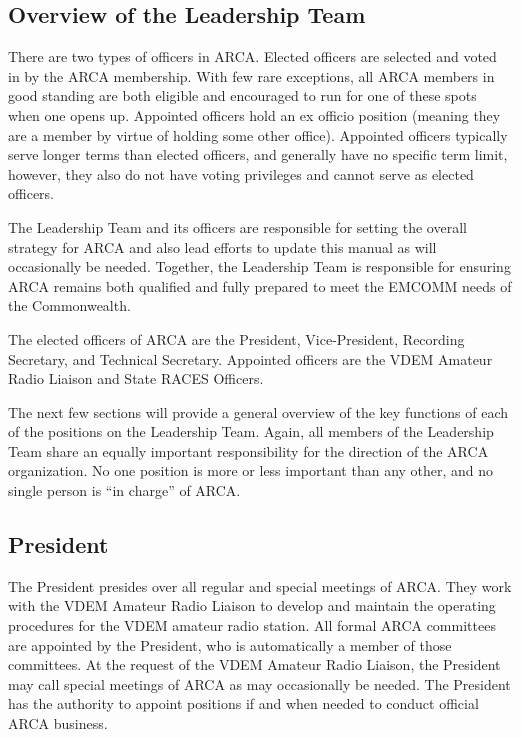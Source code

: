 \documentclass[pdflatex,letterpaper,twoside,12pt]{book}
\begin{document}
\subsection{Overview of the Leadership Team}

There are two types of officers in ARCA.  Elected officers are selected and voted in by the ARCA membership.  With few rare exceptions, all ARCA members in good standing are both eligible and encouraged to run for one of these spots when one opens up.  Appointed officers hold an ex officio position (meaning they are a member by virtue of holding some other office).  Appointed officers typically serve longer terms than elected officers, and generally have no specific term limit, however, they also do not have voting privileges and cannot serve as elected officers.

The Leadership Team and its officers are responsible for setting the overall strategy for ARCA and also lead efforts to update this manual as will occasionally be needed.  Together, the Leadership Team is responsible for ensuring ARCA remains both qualified and fully prepared to meet the EMCOMM needs of the Commonwealth.

The elected officers of ARCA are the President, Vice-President, Recording Secretary, and Technical Secretary.  Appointed officers are the VDEM Amateur Radio Liaison and State RACES Officers.

The next few sections will provide a general overview of the key functions of each of the positions on the Leadership Team.  Again, all members of the Leadership Team share an equally important responsibility for the direction of the ARCA organization.  No one position is more or less important than any other, and no single person is ``in charge'' of ARCA.

\subsection{President}

The President presides over all regular and special meetings of ARCA.  They work with the VDEM Amateur Radio Liaison to develop and maintain the operating procedures for the VDEM amateur radio station.  All formal ARCA committees are appointed by the President, who is automatically a member of those committees.  At the request of the VDEM Amateur Radio Liaison, the President may call special meetings of ARCA as may occasionally be needed.  The President has the authority to appoint positions if and when needed to conduct official ARCA business.
\end{document}
